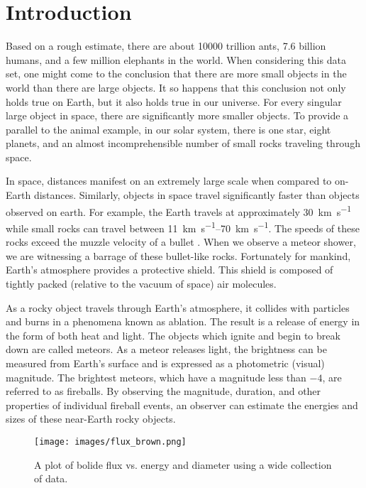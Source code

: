 \chapter{Introduction}

Based on a rough estimate, there are about \num{10000} trillion ants, \num{7.6} billion humans, and a few million elephants in the world.
When considering this data set, one might come to the conclusion that there are more small objects in the world than there are large objects.
It so happens that this conclusion not only holds true on Earth, but it also holds true in our universe.
For every singular large object in space, there are significantly more smaller objects.
To provide a parallel to the animal example, in our solar system, there is one star, eight planets, and an almost incomprehensible number of small rocks traveling through space. 

In space, distances manifest on an extremely large scale when compared to on-Earth distances.  
Similarly, objects in space travel significantly faster than objects observed on earth.
For example, the Earth travels at approximately \SI{30}{\kilo\meter\per\second} while small rocks can travel between \SIrange{11}{70}{\kilo\meter\per\second}.  
The speeds of these rocks exceed the muzzle velocity of a bullet \cite{russell_photometry_2018}.
When we observe a meteor shower, we are witnessing a barrage of these bullet-like rocks.  
Fortunately for mankind, Earth’s atmosphere provides a protective shield.
This shield is composed of tightly packed (relative to the vacuum of space) air molecules.

As a rocky object travels through Earth’s atmosphere, it collides with particles and burns in a phenomena known as ablation.  
The result is a release of energy in the form of both heat and light.  
The objects which ignite and begin to break down are called meteors.
As a meteor releases light, the brightness can be measured from Earth's surface and is expressed as a photometric (visual) magnitude. 
The brightest meteors, which have a magnitude less than $-4$, are referred to as fireballs.
By observing the magnitude, duration, and other properties of individual fireball events, an observer can estimate the energies and sizes of these near-Earth rocky objects.

\begin{figure}[ht!]
  \centering
  \texttt{[image: images/flux\_brown.png]}
  \caption{A plot of bolide flux vs. energy and diameter using a wide collection of data.}
  \label{brown}
\end{figure}

